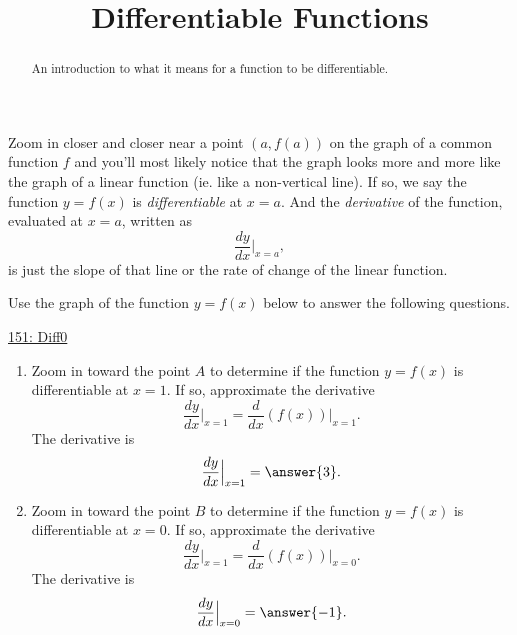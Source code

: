 \documentclass{ximera}
\title{Differentiable Functions}
\begin{document}
\begin{abstract}
An introduction to what it means for a function to be differentiable.
\end{abstract}
\maketitle

Zoom in closer and closer near a point $(a,f(a))$ on the graph of a common function $f$ and you'll most likely notice that the graph looks more and more like the graph of a linear function (ie. like a non-vertical line). If so, we say the function $y=f(x)$ is \emph{differentiable} at $x=a$. And the \emph{derivative} of the function, evaluated at $x=a$, written as
\[
     \frac{dy}{dx}\Big|_{x=a},
\]
is just the slope of that line or the rate of change of the linear function.

\begin{exploration}  \label{Exp:34gt4trt}
Use the graph of the function $y=f(x)$ below to answer the following questions.

\begin{onlineOnly}
    \begin{center}
\end{center}
\end{onlineOnly}

\href{https://www.desmos.com/calculator/ojdj4r3r9v}{151: Diff0}

\begin{enumerate}
\item Zoom in toward the point $A$ to determine if the function $y=f(x)$ is differentiable at $x=1$. If so, approximate the derivative
\[
      \frac{dy}{dx}\Big|_{x=1} = \frac{d}{dx}\left( f(x) \right) \Big|_{x=1}.
\]
The derivative is
\[
       \frac{dy}{dx}\Big|_{x=1} = \answer{3} .
\]

\item Zoom in toward the point $B$ to determine if the function $y=f(x)$ is differentiable at $x=0$. If so, approximate the derivative
\[
      \frac{dy}{dx}\Big|_{x=1} = \frac{d}{dx}\left( f(x) \right) \Big|_{x=0}.
\]
The derivative is
\[
       \frac{dy}{dx}\Big|_{x=0} = \answer{-1} .
\]
\end{enumerate}


\end{exploration}
\end{document}
